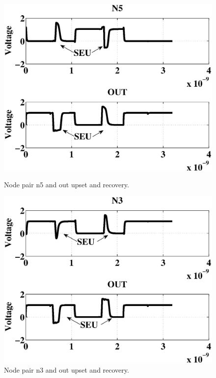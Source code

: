 \begin{figure}[!htbp]
\centering
\parbox{4cm}{
\includegraphics[width=\linewidth]{Figures/WavePlots/n5out.eps}
\caption{Node pair n5 and out upset and recovery.}
\label{fig:n3out}}
\qquad
\begin{minipage}{4cm}
\includegraphics[width=\linewidth]{Figures/WavePlots/n3out.eps}
\caption{Node pair n3 and out upset and recovery.}
\label{fig:n5n6}
\end{minipage}
\end{figure}

